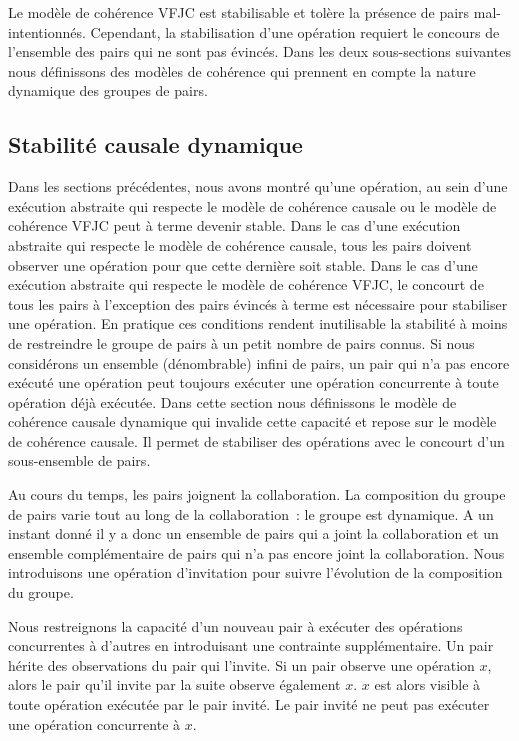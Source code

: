 Le modèle de cohérence \ac{VFJC} est stabilisable et tolère la présence de pairs mal-intentionnés.
Cependant, la stabilisation d'une opération requiert le concours de l'ensemble des pairs qui ne sont pas évincés.
Dans les deux sous-sections suivantes nous définissons des modèles de cohérence qui prennent en compte la nature dynamique des groupes de pairs.


\subsection{Stabilité causale dynamique}\label{subsec:dcs}

Dans les sections précédentes, nous avons montré qu'une opération, au sein d'une exécution abstraite qui respecte le modèle de cohérence causale ou le modèle de cohérence \ac{VFJC} peut à terme devenir stable.
Dans le cas d'une exécution abstraite qui respecte le modèle de cohérence causale, tous les pairs doivent observer une opération pour que cette dernière soit stable.
Dans le cas d'une exécution abstraite qui respecte le modèle de cohérence \ac{VFJC}, le concourt de tous les pairs à l'exception des pairs évincés à terme est nécessaire pour stabiliser une opération.
En pratique ces conditions rendent inutilisable la stabilité à moins de restreindre le groupe de pairs à un petit nombre de pairs connus.
Si nous considérons un ensemble (dénombrable) infini de pairs, un pair qui n'a pas encore exécuté une opération peut toujours exécuter une opération concurrente à toute opération déjà exécutée.
Dans cette section nous définissons le modèle de cohérence causale dynamique qui invalide cette capacité et repose sur le modèle de cohérence causale.
Il permet de stabiliser des opérations avec le concourt d'un sous-ensemble de pairs.

Au cours du temps, les pairs joignent la collaboration.
La composition du groupe de pairs varie tout au long de la collaboration~: le groupe est dynamique.
A un instant donné il y a donc un ensemble de pairs qui a joint la collaboration et un ensemble complémentaire de pairs qui n'a pas encore joint la collaboration.
Nous introduisons une opération d'invitation pour suivre l'évolution de la composition du groupe.

Nous restreignons la capacité d'un nouveau pair à exécuter des opérations concurrentes à d'autres en introduisant une contrainte supplémentaire.
Un pair hérite des observations du pair qui l'invite.
Si un pair observe une opération $x$, alors le pair qu'il invite par la suite observe également $x$.
$x$ est alors visible à toute opération exécutée par le pair invité.
Le pair invité ne peut pas exécuter une opération concurrente à $x$.

